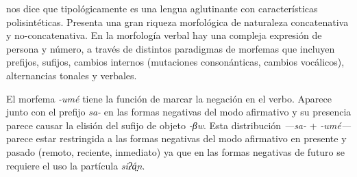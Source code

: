 \textcolor{MidnightBlue}{\citet{chichimeco}} nos dice que tipológicamente es una lengua aglutinante con características polisintéticas. Presenta una gran riqueza morfológica de naturaleza concatenativa y no-concatenativa. En la morfología verbal hay una compleja expresión de persona y número, a través de distintos paradigmas de morfemas que incluyen prefijos, sufijos, cambios internos (mutaciones consonánticas, cambios vocálicos), alternancias tonales y verbales.

El morfema \textit{-umé} tiene la función de marcar la negación en el verbo. Aparece junto con el prefijo \textit{sa-} en las formas negativas del modo afirmativo y su presencia parece causar la elisión del sufijo de objeto {\setmainfont{Charis SIL}\textit{-βw}}. Esta distribución \textit{—sa-} + \textit{-umé—} parece estar restringida a las formas negativas del modo afirmativo en presente y pasado (remoto, reciente, inmediato) ya que en las formas negativas de futuro se requiere el uso la partícula {\setmainfont{Charis SIL}\textit{siʔá̤n}.}
